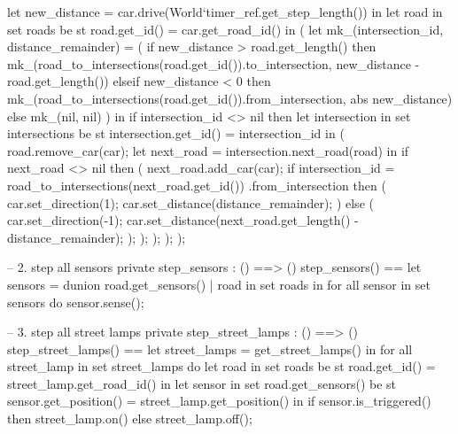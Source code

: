 \documentclass[a4paper]{article}
\begin{document}
\begin{vdm_al}
                let new_distance = car.drive(World`timer_ref.get_step_length()) in 
                    let road in set roads be st road.get_id() = car.get_road_id() in (
                        let mk_(intersection_id, distance_remainder) = (
                            if new_distance > road.get_length() then
                                mk_(road_to_intersections(road.get_id()).to_intersection, new_distance - road.get_length())
                            elseif new_distance < 0 then
                                mk_(road_to_intersections(road.get_id()).from_intersection, abs new_distance)
                            else mk_(nil, nil)
                            ) in
                                if intersection_id <> nil then
                                    let intersection in set intersections be st intersection.get_id() = intersection_id in (
                                        road.remove_car(car);
                                        let next_road = intersection.next_road(road) in
                                            if next_road <> nil then (
                                                next_road.add_car(car);
                                                if intersection_id
                                                   = road_to_intersections(next_road.get_id())
                                                   .from_intersection then (
                                                    car.set_direction(1);
                                                    car.set_distance(distance_remainder);
                                                ) else (
                                                    car.set_direction(-1);
                                                    car.set_distance(next_road.get_length() - distance_remainder);
                                                );
                                            );
                                    );
                    );
            );

    -- 2. step all sensors
    private step_sensors : () ==> ()
    step_sensors() ==
        let sensors = dunion {
            road.get_sensors()
            | road in set roads
        } in
            for all sensor in set sensors do
                sensor.sense();

    -- 3. step all street lamps
    private step_street_lamps : () ==> ()
    step_street_lamps() ==
        let street_lamps = get_street_lamps() in
            for all street_lamp in set street_lamps do
                let road in set roads be st road.get_id() = street_lamp.get_road_id() in
                    let sensor in set road.get_sensors() be st sensor.get_position() = street_lamp.get_position() in
                        if sensor.is_triggered() then
                            street_lamp.on()
                        else
                            street_lamp.off();


\end{vdm_al}
\end{document}
